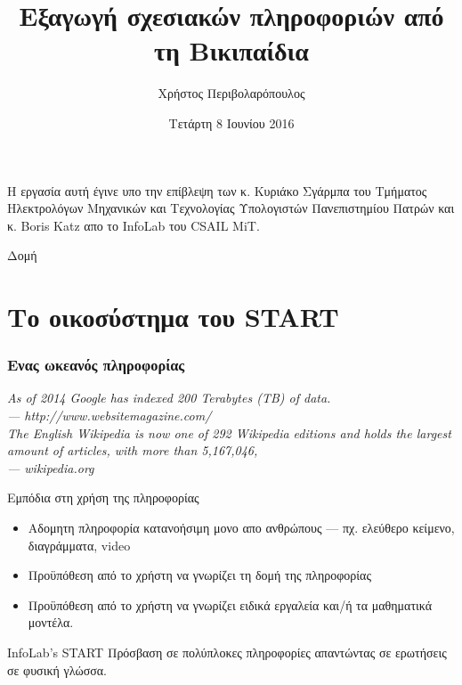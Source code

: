 \documentclass[bigger]{beamer}
\author{Χρήστος Περιβολαρόπουλος}
\date{Τετάρτη 8 Ιουνίου 2016}
\title{Εξαγωγή σχεσιακών πληροφοριών από τη Βικιπαίδια}
\begin{document}
\maketitle

\begin{frame}
  Η εργασία αυτή έγινε υπο την επίβλεψη των κ. Κυριάκο Σγάρμπα του
  Τμήματος Ηλεκτρολόγων Μηχανικών και Τεχνολογίας Υπολογιστών
  Πανεπιστημίου Πατρών και κ. Boris Katz απο το InfoLab του CSAIL MiT.
\end{frame}

\begin{frame}{Δομή}
  \tableofcontents
\end{frame}

\section{Το οικοσύστημα του START}
\begin{frame}
  \frametitle{Ενας ωκεανός πληροφορίας}
  \textit{As of 2014 Google has indexed 200 Terabytes (TB) of data. \\
    \hfill --- http://www.websitemagazine.com/} \\

  \vfill
  \textit{The English Wikipedia is now one of 292 Wikipedia
    editions and holds the largest amount of articles, with more than
    5,167,046, \\ \hfill --- wikipedia.org }

  \vfiil
\end{frame}

\begin{frame}[fragile]{Εμπόδια στη χρήση της πληροφορίας}
  \begin{itemize}
  \item Αδομητη πληροφορία κατανοήσιμη μονο απο ανθρώπους ---
    πχ. ελεύθερο κείμενο, διαγράμματα, video
  \item Προϋπόθεση από το χρήστη να γνωρίζει τη δομή της πληροφορίας
  \item Προϋπόθεση από το χρήστη να γνωρίζει ειδικά εργαλεία και/ή τα
    μαθηματικά μοντέλα.
  \end{itemize}
\end{frame}

\begin{frame}[fragile]{InfoLab's START}
  Πρόσβαση σε πολύπλοκες πληροφορίες απαντώντας σε ερωτήσεις σε φυσική
  γλώσσα.
\end{frame}
\end{document}
